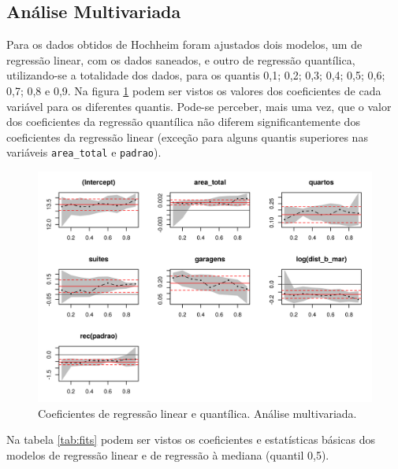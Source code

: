 \documentclass[a4paper, 12pt]{article}
\begin{document}
\hypertarget{analise-multivariada}{%
\subsection{Análise Multivariada}\label{analise-multivariada}}

Para os dados obtidos de Hochheim \autocite*[22-23]{hochheim} foram
ajustados dois modelos, um de regressão linear, com os dados saneados, e
outro de regressão quantílica, utilizando-se a totalidade dos dados,
para os quantis 0,1; 0,2; 0,3; 0,4; 0,5; 0,6; 0,7; 0,8 e 0,9. Na figura
\ref{fig:coefs} podem ser vistos os valores dos coeficientes de cada
variável para os diferentes quantis. Pode-se perceber, mais uma vez, que
o valor dos coeficientes da regressão quantílica não diferem
significantemente dos coeficientes da regressão linear (exceção para
alguns quantis superiores nas variáveis \texttt{area\_total} e
\texttt{padrao}).

\begin{figure}[H]

{\centering \includegraphics[width=1\linewidth]{images/coefs-1} 

}

\caption{Coeficientes de regressão linear e quantílica. Análise multivariada.}\label{fig:coefs}
\end{figure}

Na tabela \ref{tab:fits} podem ser vistos os coeficientes e estatísticas
básicas dos modelos de regressão linear e de regressão à mediana
(quantil 0,5).
\end{document}
